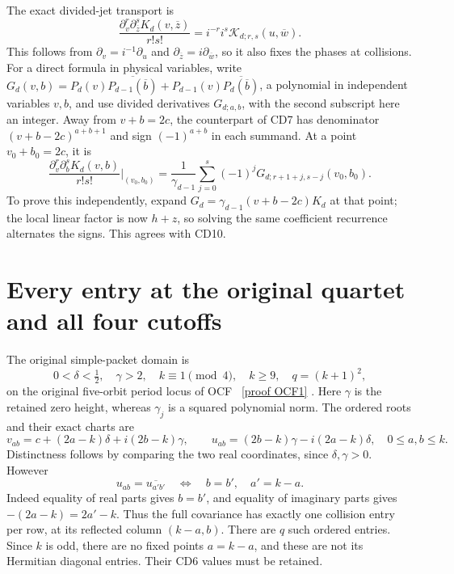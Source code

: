 The exact divided-jet transport is
\begin{equation}\label{cdroot:eq:S-jets}
 \frac{\partial_v^r\partial_{\overline z}^sK_d(v,\overline z)}{r!s!}
   =i^{-r}i^s\mathcal K_{d;r,s}(u,\overline w).
 \tag{CD10}
\end{equation}
This follows from \(\partial_v=i^{-1}\partial_u\) and
\(\partial_{\overline z}=i\partial_{\overline w}\), so it also
fixes the phases at collisions. For a direct formula in physical
variables, write \(G_d(v,b)=P_d(v)\overline{P_{d-1}(\overline b)}+
P_{d-1}(v)\overline{P_d(\overline b)}\), a polynomial in independent
variables \(v,b\), and use divided derivatives \(G_{d;a,b}\), with
the second subscript here an integer. Away from \(v+b=2c\), the
counterpart of CD7 has denominator \((v+b-2c)^{a+b+1}\) and sign
\((-1)^{a+b}\) in each summand. At a point \(v_0+b_0=2c\), it is
\begin{equation}\label{cdroot:eq:S-jets-collision}
 \frac{\partial_v^r\partial_b^sK_d(v,b)}{r!s!}
 \bigg|_{(v_0,b_0)}
  =\frac1{\gamma_{d-1}}
      \sum_{j=0}^s(-1)^jG_{d;r+1+j,s-j}(v_0,b_0).
 \tag{CD11}
\end{equation}
To prove this independently, expand
\(G_d=\gamma_{d-1}(v+b-2c)K_d\) at that point; the local linear
factor is now \(h+z\), so solving the same coefficient recurrence
alternates the signs. This agrees with CD10.

\section{Every entry at the original quartet and all four cutoffs}

The original simple-packet domain is
\[
 0<\delta<\tfrac12,\quad \gamma>2,\quad k\equiv1\pmod4,
 \quad k\geq9,\quad q=(k+1)^2,
\]
on the original five-orbit period locus of OCF \cite{cdroot:OCF}%
~\href{https://github.com/KokunoYumeto/zeta-function-research-reader/blob/5992ad50c0f2a06921f1fcaded7b4e38097c0739/workbenches/splitzero-tandem/continuations/20260920-original-kernel-mixed-determinants/providers/ORIGINAL_CONDUCTOR_STRIP_FRAME.tex\#L27}{[proof OCF1]}%
{}. Here
\(\gamma\) is the retained zero height, whereas \(\gamma_j\) is a
squared polynomial norm. The ordered roots and their exact charts are
\begin{equation}\label{cdroot:eq:roots}
 v_{ab}=c+(2a-k)\delta+i(2b-k)\gamma,
 \qquad u_{ab}=(2b-k)\gamma-i(2a-k)\delta,
 \quad 0\leq a,b\leq k.
 \tag{CD12}
\end{equation}
Distinctness follows by comparing the two real coordinates, since
\(\delta,\gamma>0\). However
\[
 u_{ab}=\overline{u_{a'b'}}
 \quad\Longleftrightarrow\quad b=b',\quad a'=k-a.
\]
Indeed equality of real parts gives \(b=b'\), and equality of imaginary
parts gives \(-(2a-k)=2a'-k\). Thus the full covariance has exactly
one collision entry per row, at its reflected column \((k-a,b)\).
There are \(q\) such ordered entries. Since \(k\) is odd, there are no
fixed points \(a=k-a\), and these are not its Hermitian diagonal
entries. Their CD6 values must be retained.

